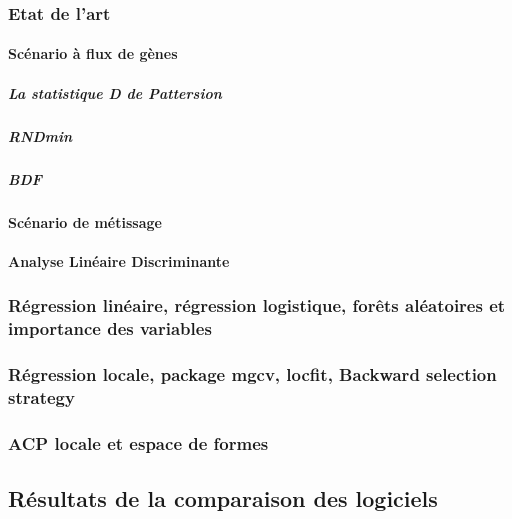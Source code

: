 \documentclass[12pt,twoside]{reedthesis}
\begin{document}
  \subsubsection{Etat de l'art}\label{etat-de-lart-1}
  
  \paragraph{Scénario à flux de gènes}\label{scenario-a-flux-de-genes}
  
  \subparagraph{La statistique D de
  Pattersion}\label{la-statistique-d-de-pattersion}
  
  \subparagraph{RNDmin}\label{rndmin}
  
  \subparagraph{BDF}\label{bdf}
  
  \paragraph{Scénario de métissage}\label{scenario-de-metissage}
  
  \paragraph{Analyse Linéaire
  Discriminante}\label{analyse-lineaire-discriminante}
  
  \subsubsection{Régression linéaire, régression logistique, forêts
  aléatoires et importance des
  variables}\label{regression-lineaire-regression-logistique-forets-aleatoires-et-importance-des-variables}
  
  \subsubsection{Régression locale, package mgcv, locfit, Backward
  selection
  strategy}\label{regression-locale-package-mgcv-locfit-backward-selection-strategy}
  
  \subsubsection{ACP locale et espace de
  formes}\label{acp-locale-et-espace-de-formes}
  
  \subsection{Résultats de la comparaison des
  logiciels}\label{resultats-de-la-comparaison-des-logiciels}
  
\end{document}
